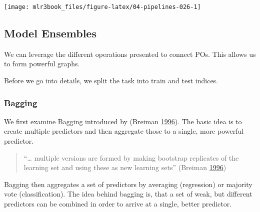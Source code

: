 \documentclass[
  11pt,
  parskip=half,
  DIV=calc,
  BCOR=10mm,
  x11names]{scrbook}
\newenvironment{Shaded}{}{}
\newcommand{\DecValTok}[1]{#1}
\newcommand{\KeywordTok}[1]{\textcolor[rgb]{0.00,0.00,1.00}{#1}}
\newcommand{\NormalTok}[1]{#1}
\newcommand{\OperatorTok}[1]{#1}
\newcommand{\StringTok}[1]{\textcolor[rgb]{0.00,0.50,0.50}{#1}}
\begin{document}
\begin{center}\texttt{[image: mlr3book\_files/figure-latex/04-pipelines-026-1]} \end{center}

\hypertarget{pipe-model-ensembles}{%
\subsection{Model Ensembles}\label{pipe-model-ensembles}}

We can leverage the different operations presented to connect POs.
This allows us to form powerful graphs.

Before we go into details, we split the task into train and test indices.

\begin{Shaded}
\end{Shaded}

\hypertarget{pipe-model-ensembles-bagging}{%
\subsubsection{Bagging}\label{pipe-model-ensembles-bagging}}

We first examine Bagging introduced by (Breiman \protect\hyperlink{ref-Breiman1996}{1996}).
The basic idea is to create multiple predictors and then aggregate those to a single, more powerful predictor.

\begin{quote}
``\ldots{} multiple versions are formed
by making bootstrap replicates of the learning set
and using these as new learning sets'' (Breiman \protect\hyperlink{ref-Breiman1996}{1996})
\end{quote}

Bagging then aggregates a set of predictors by averaging (regression) or majority vote (classification).
The idea behind bagging is, that a set of weak, but different predictors can be combined in order to arrive at a single, better predictor.
\end{document}
